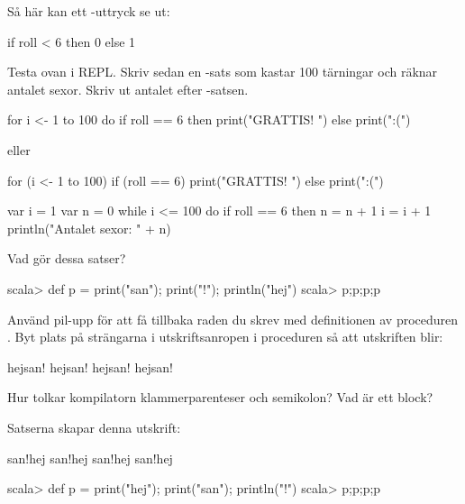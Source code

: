 \Subtask Så här kan ett -uttryck se ut:
\begin{Code}
if roll < 6 then 0 else 1
\end{Code}
Testa ovan i REPL. Skriv sedan en -sats som kastar 100 tärningar och räknar antalet sexor. Skriv ut antalet efter -satsen.

\SOLUTION

\TaskSolved \what

\SubtaskSolved
\begin{Code}
for i <- 1 to 100 do 
  if roll == 6 then print("GRATTIS! ") else print(":(")
\end{Code}
eller
\begin{Code}
for (i <- 1 to 100) if (roll == 6) print("GRATTIS! ") else print(":(")
\end{Code}

\SubtaskSolved
\begin{Code}
var i = 1
var n = 0
while i <= 100 do
  if roll == 6 then n = n + 1
  i = i + 1
println("Antalet sexor: " + n)
\end{Code}


\QUESTEND




\QUESTBEGIN

\Task \what

\Subtask Vad gör dessa satser?
\begin{REPLnonum}
scala> def p = { print("san"); print("!"); println("hej")}
scala> p;p;p;p
\end{REPLnonum}

\Subtask
Använd pil-upp för att få tillbaka raden du skrev med definitionen av proceduren . Byt plats på strängarna i utskriftsanropen i proceduren  så att utskriften blir:
\begin{REPLnonum}
hejsan!
hejsan!
hejsan!
hejsan!
\end{REPLnonum}

\Subtask Hur tolkar kompilatorn klammerparenteser och semikolon? Vad är ett block?

\SOLUTION

\TaskSolved \what

\SubtaskSolved
Satserna skapar denna utskrift:
\begin{REPLnonum}
san!hej
san!hej
san!hej
san!hej
\end{REPLnonum}

\SubtaskSolved
\begin{REPLnonum}
scala> def p = { print("hej"); print("san"); println("!")}
scala> p;p;p;p
\end{REPLnonum}

